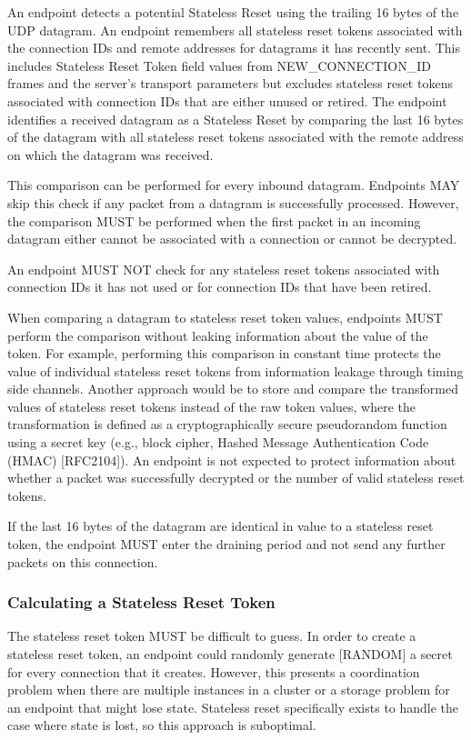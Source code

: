 \documentclass{article}
\begin{document}
An endpoint detects a potential Stateless Reset using the trailing 16 bytes of the UDP datagram.  An endpoint remembers all stateless reset tokens associated with the connection IDs and remote addresses for datagrams it has recently sent.  This includes Stateless Reset Token field values from NEW\_CONNECTION\_ID frames and the server's transport parameters but excludes stateless reset tokens associated with connection IDs that are either unused or retired.  The endpoint identifies a received datagram as a Stateless Reset by comparing the last 16 bytes of the datagram with all stateless reset tokens associated with the remote address on which the datagram was received.

This comparison can be performed for every inbound datagram. Endpoints MAY skip this check if any packet from a datagram is successfully processed.  However, the comparison MUST be performed when the first packet in an incoming datagram either cannot be associated with a connection or cannot be decrypted.

An endpoint MUST NOT check for any stateless reset tokens associated with connection IDs it has not used or for connection IDs that have been retired.

When comparing a datagram to stateless reset token values, endpoints MUST perform the comparison without leaking information about the value of the token.  For example, performing this comparison in constant time protects the value of individual stateless reset tokens from information leakage through timing side channels.  Another approach would be to store and compare the transformed values of stateless reset tokens instead of the raw token values, where the transformation is defined as a cryptographically secure pseudorandom function using a secret key (e.g., block cipher, Hashed Message Authentication Code (HMAC) [RFC2104]).  An endpoint is not expected to protect information about whether a packet was successfully decrypted or the number of valid stateless reset tokens.

If the last 16 bytes of the datagram are identical in value to a stateless reset token, the endpoint MUST enter the draining period and not send any further packets on this connection.

\subsubsection{Calculating a Stateless Reset Token}

The stateless reset token MUST be difficult to guess.  In order to create a stateless reset token, an endpoint could randomly generate [RANDOM] a secret for every connection that it creates.  However, this presents a coordination problem when there are multiple instances in a cluster or a storage problem for an endpoint that might lose state.  Stateless reset specifically exists to handle the case where state is lost, so this approach is suboptimal.
\end{document}
